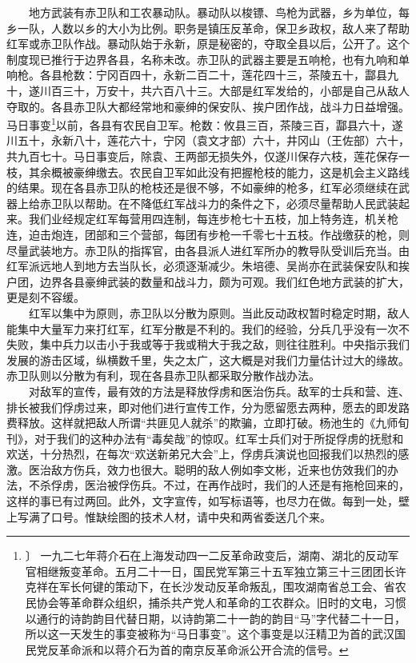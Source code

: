 \documentclass[cn,11pt,chinese]{elegantbook}
\begin{document}
　　地方武装有赤卫队和工农暴动队。暴动队以梭镖、鸟枪为武器，乡为单位，每乡一队，人数以乡的大小为比例。职务是镇压反革命，保卫乡政权，敌人来了帮助红军或赤卫队作战。暴动队始于永新，原是秘密的，夺取全县以后，公开了。这个制度现已推行于边界各县，名称未改。赤卫队的武器主要是五响枪，也有九响和单响枪。各县枪数：宁冈百四十，永新二百二十，莲花四十三，茶陵五十，酃县九十，遂川百三十，万安十，共六百八十三。大部是红军发给的，小部是自己从敌人夺取的。各县赤卫队大都经常地和豪绅的保安队、挨户团作战，战斗力日益增强。马日事变\footnote[20]{〕 一九二七年蒋介石在上海发动四一二反革命政变后，湖南、湖北的反动军官相继叛变革命。五月二十一日，国民党军第三十五军独立第三十三团团长许克祥在军长何键的策动下，在长沙发动反革命叛乱，围攻湖南省总工会、省农民协会等革命群众组织，捕杀共产党人和革命的工农群众。旧时的文电，习惯以通行的诗韵韵目代替日期，以诗韵第二十一韵的韵目“马”字代替二十一日，所以这一天发生的事变被称为“马日事变”。这个事变是以汪精卫为首的武汉国民党反革命派和以蒋介石为首的南京反革命派公开合流的信号。}以前，各县有农民自卫军。枪数：攸县三百，茶陵三百，酃县六十，遂川五十，永新八十，莲花六十，宁冈（袁文才部）六十，井冈山（王佐部）六十，共九百七十。马日事变后，除袁、王两部无损失外，仅遂川保存六枝，莲花保存一枝，其余概被豪绅缴去。农民自卫军如此没有把握枪枝的能力，这是机会主义路线的结果。现在各县赤卫队的枪枝还是很不够，不如豪绅的枪多，红军必须继续在武器上给赤卫队以帮助。在不降低红军战斗力的条件之下，必须尽量帮助人民武装起来。我们业经规定红军每营用四连制，每连步枪七十五枝，加上特务连，机关枪连，迫击炮连，团部和三个营部，每团有步枪一千零七十五枝。作战缴获的枪，则尽量武装地方。赤卫队的指挥官，由各县派人进红军所办的教导队受训后充当。由红军派远地人到地方去当队长，必须逐渐减少。朱培德、吴尚亦在武装保安队和挨户团，边界各县豪绅武装的数量和战斗力，颇为可观。我们红色地方武装的扩大，更是刻不容缓。\\
　　红军以集中为原则，赤卫队以分散为原则。当此反动政权暂时稳定时期，敌人能集中大量军力来打红军，红军分散是不利的。我们的经验，分兵几乎没有一次不失败，集中兵力以击小于我或等于我或稍大于我之敌，则往往胜利。中央指示我们发展的游击区域，纵横数千里，失之太广，这大概是对我们力量估计过大的缘故。赤卫队则以分散为有利，现在各县赤卫队都采取分散作战办法。\\
　　对敌军的宣传，最有效的方法是释放俘虏和医治伤兵。敌军的士兵和营、连、排长被我们俘虏过来，即对他们进行宣传工作，分为愿留愿去两种，愿去的即发路费释放。这样就把敌人所谓“共匪见人就杀”的欺骗，立即打破。杨池生的《九师旬刊》，对于我们的这种办法有“毒矣哉”的惊叹。红军士兵们对于所捉俘虏的抚慰和欢送，十分热烈，在每次“欢送新弟兄大会”上，俘虏兵演说也回报我们以热烈的感激。医治敌方伤兵，效力也很大。聪明的敌人例如李文彬，近来也仿效我们的办法，不杀俘虏，医治被俘伤兵。不过，在再作战时，我们的人还是有拖枪回来的，这样的事已有过两回。此外，文字宣传，如写标语等，也尽力在做。每到一处，壁上写满了口号。惟缺绘图的技术人材，请中央和两省委送几个来。\\
\end{document}
